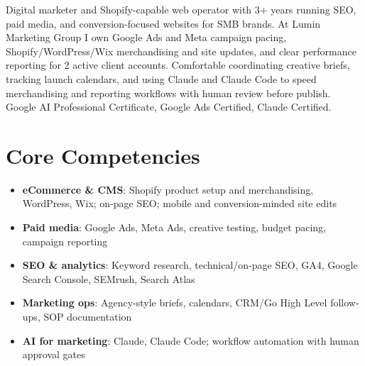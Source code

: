 \documentclass[11pt,a4paper,sans]{moderncv}
\begin{document}
\makecvtitle

\vspace{6pt}
\small{Digital marketer and Shopify-capable web operator with 3+ years running SEO, paid media, and conversion-focused websites for SMB brands. At Lumin Marketing Group I own Google Ads and Meta campaign pacing, Shopify/WordPress/Wix merchandising and site updates, and clear performance reporting for 2 active client accounts. Comfortable coordinating creative briefs, tracking launch calendars, and using Claude and Claude Code to speed merchandising and reporting workflows with human review before publish. Google AI Professional Certificate, Google Ads Certified, Claude Certified.}

\section{Core Competencies}
\vspace{1pt}
\begin{itemize}
\item \textbf{eCommerce \& CMS}: Shopify product setup and merchandising, WordPress, Wix; on-page SEO; mobile and conversion-minded site edits
\item \textbf{Paid media}: Google Ads, Meta Ads, creative testing, budget pacing, campaign reporting
\item \textbf{SEO \& analytics}: Keyword research, technical/on-page SEO, GA4, Google Search Console, SEMrush, Search Atlas
\item \textbf{Marketing ops}: Agency-style briefs, calendars, CRM/Go High Level follow-ups, SOP documentation
\item \textbf{AI for marketing}: Claude, Claude Code; workflow automation with human approval gates
\end{itemize}
\end{document}
